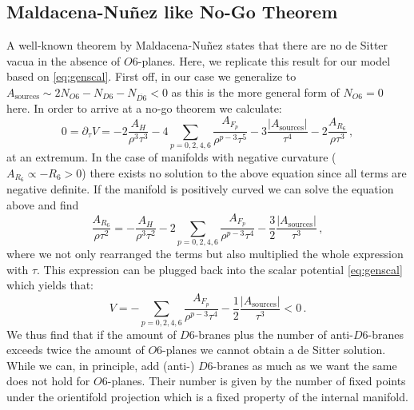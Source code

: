 \documentclass[a4paper,12pt,twoside,openright]{report}
\newcommand{\be}{\begin{equation}}
\newcommand{\ee}{\end{equation}}
\begin{document}
\subsection{Maldacena-Nu\~nez like No-Go Theorem}
A well-known theorem by Maldacena-Nu\~nez \cite{Maldacena:2000mw} states that there are no de Sitter vacua in the absence of $O6$-planes. Here, we replicate this result for our model based on \eqref{eq:genscal}. First off, in our case we generalize to $A_{\text{sources}} \sim 2 N_{O6} - N_{D6} - N_{\overline{D6}} < 0$ as this is the more general form of $N_{O6}=0$ here. In order to arrive at a no-go theorem we calculate:
\be 
0= \partial_\tau V = -2 \frac{A_H}{\rho^ 3 \tau^3} - 4 \sum_{p=0,2,4,6} \frac{A_{F_p}}{\rho^ {p-3}\tau^ 5} - 3 \frac{|A_{\text{sources}}|}{\tau^ 4} - 2 \frac{A_{R_6}}{\rho \tau^3}\,,
\ee
at an extremum. In the case of manifolds with negative curvature ($A_{R_6} \propto -R_6 >0$) there exists no solution to the above equation since all terms are negative definite. If the manifold is positively curved we can solve the equation above and find 
\be 
\frac{A_{R_6}}{\rho \tau^ 2} = - \frac{A_H}{\rho^ 3 \tau^2} - 2 \sum_{p=0,2,4,6} \frac{A_{F_p}}{\rho^ {p-3}\tau^ 4} - \frac{3}{2} \frac{|A_{\text{sources}}|}{\tau^ 3}\,,
\ee
where we not only rearranged the terms but also multiplied the whole expression with $\tau$. This expression can be plugged back into the scalar potential \eqref{eq:genscal} which yields that:
\be 
V = -\sum_{p=0,2,4,6} \frac{A_{F_p}}{\rho^ {p-3}\tau^ 4} - \frac{1}{2} \frac{|A_{\text{sources}}|}{\tau^ 3} < 0\,.
\ee
We thus find that if the amount of $D6$-branes plus the number of anti-$D6$-branes exceeds twice the amount of $O6$-planes we cannot obtain a de Sitter solution. While we can, in principle, add (anti-) $D6$-branes as much as we want the same does not hold for $O6$-planes. Their number is given by the number of fixed points under the orientifold projection which is a fixed property of the internal manifold.
\end{document}
